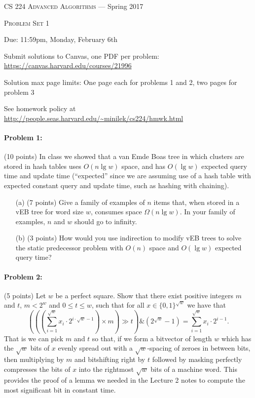 \documentclass[12pt]{article}
\begin{document}
\thispagestyle{empty}

\begin{center}
{\Large \textsc{CS 224 Advanced Algorithms} --- Spring 2017}

\bigskip

{\Large \textsc{Problem Set 1}}

\smallskip

Due: 11:59pm, Monday, February 6th

\medskip

Submit solutions to Canvas, one PDF per problem: \url{https://canvas.harvard.edu/courses/21996}

\medskip

Solution max page limits: One page each for problems 1 and 2, two pages for problem 3

\bigskip

{\footnotesize See homework policy at \url{http://people.seas.harvard.edu/~minilek/cs224/hmwk.html}}
\end{center}

\paragraph{Problem 1:} (10 points) In class we showed that a van Emde Boas tree in which clusters are stored in hash tables uses $O(n\lg w)$ space, and has $O(\lg w)$ expected query time and update time (``expected'' since we are assuming use of a hash table with expected constant query and update time, such as hashing with chaining). 

\begin{itemize}
\item[(a)] (7 points) Give a family of examples of $n$ items that, when stored in a vEB tree for word size $w$, consumes space $\Omega(n\lg w)$. In your family of examples, $n$ and $w$ should go to infinity.
\item[(b)] (3 points) How would you use indirection to modify vEB trees to solve the static predecessor problem with $O(n)$ space and $O(\lg w)$ expected query time?
\end{itemize}

\paragraph{Problem 2:} (5 points) Let $w$ be a perfect square. Show that there exist positive integers $m$ and $t$, $m<2^w$ and $0\le t\le w$, such that for all $x\in\{0,1\}^{\sqrt{w}}$ we have that
$$
\left(\left(\left(\sum_{i=1}^{\sqrt{w}} x_i\cdot 2^{i\cdot \sqrt{w} - 1} \right) \times m\right) \gg t\right) \mathrel{\&} (2^{\sqrt{w}} - 1) = \sum_{i=1}^{\sqrt{w}} x_i \cdot 2^{i-1} . 
$$
That is we can pick $m$ and $t$ so that, if we form a bitvector of length $w$ which has the $\sqrt{w}$ bits of $x$ evenly spread out with a $\sqrt{w}$-spacing of zeroes in between bits, then multiplying by $m$ and bitshifting right by $t$ followed by masking perfectly compresses the bits of $x$ into the rightmost $\sqrt{w}$ bits of a machine word. This provides the proof of a lemma we needed in the Lecture 2 notes to compute the most significant bit in constant time.
\end{document}
